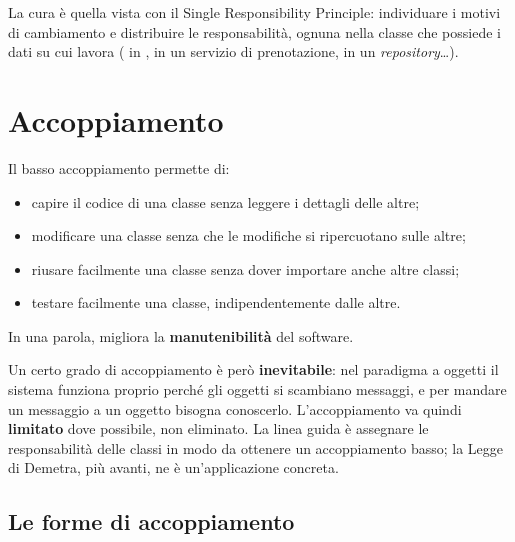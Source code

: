 La cura è quella vista con il Single Responsibility Principle: individuare i motivi di cambiamento e distribuire le
responsabilità, ognuna nella classe che possiede i dati su cui lavora ( in ,
 in un servizio di prenotazione,  in un \textit{repository}\ldots).

\section{Accoppiamento}


Il basso accoppiamento permette di:
\begin{itemize}
  \item capire il codice di una classe senza leggere i dettagli delle altre;
  \item modificare una classe senza che le modifiche si ripercuotano sulle altre;
  \item riusare facilmente una classe senza dover importare anche altre classi;
  \item testare facilmente una classe, indipendentemente dalle altre.
\end{itemize}
In una parola, migliora la \textbf{manutenibilità} del software.

Un certo grado di accoppiamento è però \textbf{inevitabile}: nel paradigma a oggetti il sistema funziona proprio perché gli
oggetti si scambiano messaggi, e per mandare un messaggio a un oggetto bisogna conoscerlo. L'accoppiamento va quindi
\textbf{limitato} dove possibile, non eliminato. La linea guida è assegnare le responsabilità delle classi in modo da
ottenere un accoppiamento basso; la Legge di Demetra, più avanti, ne è un'applicazione concreta.

\subsection{Le forme di accoppiamento}

